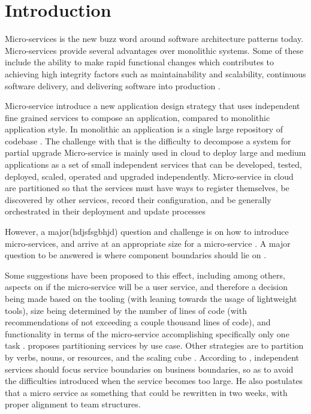 \section{Introduction} \label{Introduction}
Micro-services is the new buzz word around software architecture patterns today. Micro-services provide several advantages over monolithic systems. Some of these include the ability to make rapid functional changes which contributes to achieving high integrity factors such as maintainability and scalability, continuous software delivery, and delivering software into production \cite{thones2015microservices}. 

Micro-service introduce a new application design strategy that uses independent fine grained services to compose an application, compared to monolithic application style. In monolithic an application is a single large repository of codebase \cite{Hasselbring2016}. The challenge with that is the difficulty to decompose a system for partial upgrade \cite{Le2014} Micro-service is mainly used in cloud to deploy large and medium applications as a set of small independent services that can be developed, tested, deployed, scaled, operated and upgraded independently. Micro-service in cloud are partitioned so that the services must have ways to register themselves, be discovered by other services, record their conﬁguration, and be generally orchestrated in their deployment and update processes\cite{Villamizar2016}  

 
\noindent
However, a major(hdjsfsgbhjd) question and challenge is on how to introduce micro-services, and arrive at an appropriate size for a micro-service \cite{namiot2014micro,fowler2014microservices}. A major question to be answered is where component boundaries should lie on \cite{fowler2014microservices}.

\noindent
Some suggestions have been proposed to this effect, including among others, aspects on if the micro-service will be a user service, and therefore a decision being made based on the tooling (with leaning towards the usage of lightweight tools), size being determined by the number of lines of code (with recommendations of not exceeding a couple thousand lines of code), and functionality in terms of the micro-service accomplishing specifically only one task \cite{thones2015microservices}. \cite{namiot2014micro} proposes partitioning services by use case. Other strategies are to partition by verbs, nouns, or resources, and the scaling cube \cite{abbott2009art}. According to \cite{newman2015building}, independent services should focus service boundaries on	business	boundaries, so as to avoid the difficulties introduced when the service becomes too large. He also postulates that a micro service as something	that	could	be rewritten	in	two	weeks, with proper alignment to team structures.

